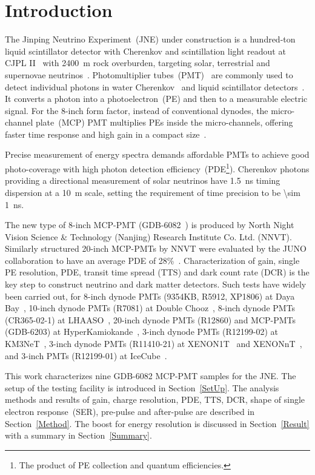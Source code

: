 \section{Introduction}
The Jinping Neutrino Experiment~(JNE) under construction is a hundred-ton liquid scintillator detector with Cherenkov and scintillation light readout
 at CJPL II~\cite{li_second-phase_2015,cheng_china_2017} with \SI{2400}{m} rock overburden, targeting solar, terrestrial and supernovae neutrinos~\cite{LetterJNE2017,xu_jinping_2020,xu_innovations_2022,xu_design_2022}.
Photomultiplier tubes~(PMT)~\cite{HAMAMATSUManual} are commonly used to detect individual photons in water Cherenkov~\cite{SNO,SuperK} and liquid scintillator detectors~\cite{KamLAND,JUNO:2015zny}. It converts a photon into a photoelectron~(PE) and then to a measurable electric signal.  For the 8-inch form factor, instead of conventional dynodes, the micro-channel plate~(MCP) PMT multiplies PEs inside the micro-channels, offering faster time response and high gain in a compact size~\cite{HAMAMATSUManual,WANG2012113,MCP-PMTworkgroup:2021hoy}.

Precise measurement of energy spectra demands affordable PMTs to achieve good photo-coverage with high photon detection efficiency~(PDE\footnote{The product of PE collection and quantum efficiencies.}). Cherenkov photons providing a directional measurement of solar neutrinos have \SI{1.5}{ns} timing dispersion at a \SI{10}{m} scale, setting the requirement of time precision to be \SI{\sim 1}{ns}.


The new type of 8-inch MCP-PMT (GDB-6082~\cite{GDB-6082}) is produced by North Night Vision Science \& Technology (Nanjing) Research Institute Co. Ltd. (NNVT). %
Similarly structured 20-inch MCP-PMTs by NNVT were evaluated by the JUNO collaboration to have an average PDE of 28\%~\cite{JUNOMassTesting}.
Characterization of gain, single PE resolution, PDE, transit time spread (TTS) and dark count rate (DCR) is the key step to construct neutrino and dark matter detectors. Such tests have widely been carried out, for 8-inch dynode PMTs (9354KB, R5912, XP1806) at Daya Bay~\cite{DayaBayTesting}, 10-inch dynode PMTs (R7081) at Double Chooz~\cite{DoubleChoozeTesting}, 8-inch dynode PMTs (CR365-02-1) at LHAASO~\cite{LHAASOTesting}, 20-inch dynode PMTs (R12860) and MCP-PMTs (GDB-6203) at HyperKamiokande~\cite{HyperKTesting}, 3-inch dynode PMTs (R12199-02) at KM3NeT~\cite{KM3NetTesting}, 3-inch dynode PMTs (R11410-21) at XENON1T~\cite{XENON1TTesting} and XENONnT~\cite{XENONnTTesting}, and 3-inch PMTs (R12199-01) at IceCube~\cite{IceCubeTesting}.

This work characterizes nine GDB-6082 MCP-PMT samples for the JNE.  The setup of the testing facility is introduced in Section~\ref{SetUp}. The analysis methods and results of gain, charge resolution, PDE, TTS, DCR, shape of single electron response~(SER), pre-pulse and after-pulse are described in Section~\ref{Method}. The boost for energy resolution is discussed in Section~\ref{Result} with a summary in Section~\ref{Summary}.
